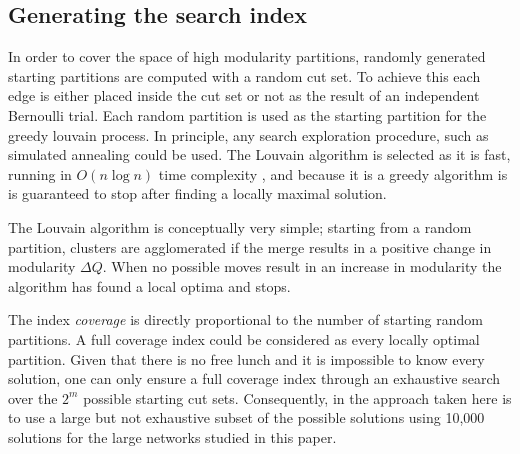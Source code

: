 \documentclass[a4paper,10pt]{article}
\begin{document}
\subsection{Generating the search index}
In order to cover the space of high modularity partitions, randomly generated starting partitions are computed with a random cut set.
To achieve this each edge is either placed inside the cut set or not as the result of an independent Bernoulli trial. 
Each random partition is used as the starting partition for the greedy louvain process.
In principle, any search exploration procedure, such as simulated annealing \cite{GuimeraNature2005} could be used.
The Louvain algorithm is selected as it is fast, running in $O(n \log n)$ time complexity \cite{blondel2008fast}, and because it is a greedy algorithm is is guaranteed to stop after finding a locally maximal solution.

The Louvain algorithm is conceptually very simple; starting from a random partition, clusters are agglomerated if the merge results in a positive change in modularity $\Delta Q$.
When no possible moves result in an increase in modularity the algorithm has found a local optima and stops.

The index \textit{coverage} is directly proportional to the number of starting random partitions.
A full coverage index could be considered as every locally optimal partition.
Given that there is no free lunch and it is impossible to know every solution, one can only ensure a full coverage index through an exhaustive search over the $2^m$ possible starting cut sets.
Consequently, in the approach taken here is to use a large but not exhaustive subset of the possible solutions using 10,000 solutions for the large networks studied in this paper.
\end{document}
